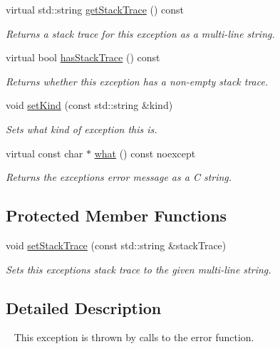 \begin{DoxyCompactItemize}
virtual std\+::string \mbox{\hyperlink{classErrorException_a79ec2353dbf71c4867c65c6c6df5dfce}{get\+Stack\+Trace}} () const
\begin{DoxyCompactList}\small\item\em Returns a stack trace for this exception as a multi-\/line string. \end{DoxyCompactList}\item 
virtual bool \mbox{\hyperlink{classErrorException_ae7ccac41c27ba02a30bdec527db0a639}{has\+Stack\+Trace}} () const
\begin{DoxyCompactList}\small\item\em Returns whether this exception has a non-\/empty stack trace. \end{DoxyCompactList}\item 
void \mbox{\hyperlink{classErrorException_a896ae13e5a5b1b89f058f7de9697c3cd}{set\+Kind}} (const std\+::string \&kind)
\begin{DoxyCompactList}\small\item\em Sets what kind of exception this is. \end{DoxyCompactList}\item 
virtual const char $\ast$ \mbox{\hyperlink{classErrorException_a576a441c2b1e2f01d271e237b314eac3}{what}} () const noexcept
\begin{DoxyCompactList}\small\item\em Returns the exception\textquotesingle{}s error message as a C string. \end{DoxyCompactList}\end{DoxyCompactItemize}
\subsection*{Protected Member Functions}
\begin{DoxyCompactItemize}
\item 
void \mbox{\hyperlink{classErrorException_aaac5126664da146aa7290235ac7b1d07}{set\+Stack\+Trace}} (const std\+::string \&stack\+Trace)
\begin{DoxyCompactList}\small\item\em Sets this exception\textquotesingle{}s stack trace to the given multi-\/line string. \end{DoxyCompactList}\end{DoxyCompactItemize}


\subsection{Detailed Description}
~\newline
 This exception is thrown by calls to the {\ttfamily error} function. 

